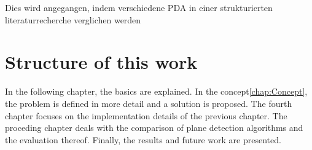 \documentclass[main.tex]{subfiles}
\begin{document}
Dies wird angegangen, indem verschiedene PDA in einer strukturierten literaturrecherche verglichen werden


\section{Structure of this work}


In the following chapter, the basics are explained. In the concept\ref{chap:Concept}, the problem is defined in more detail and a solution is proposed. 
The fourth chapter focuses on the implementation details of the previous chapter.
The proceding chapter deals with the comparison of plane detection algorithms and the evaluation thereof.
Finally, the results and future work are presented. 
\end{document}
